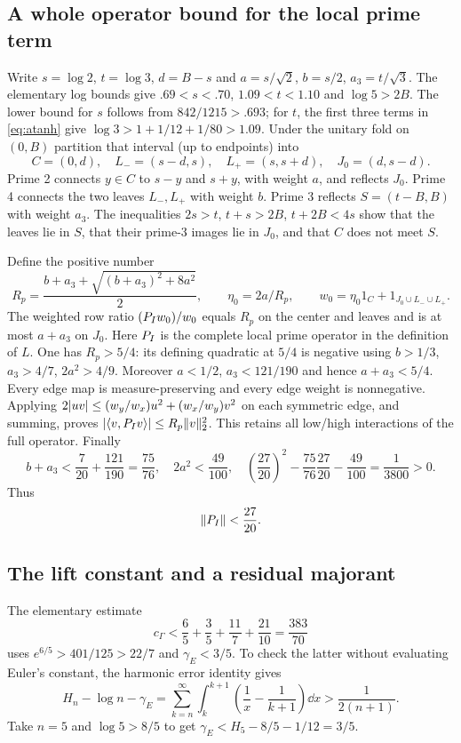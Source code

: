 \subsection{A whole operator bound for the local prime term}
Write $s=\log2$, $t=\log3$, $d=B-s$ and
$a=s/\sqrt2$, $b=s/2$, $a_3=t/\sqrt3$.
The elementary log bounds give $.69<s<.70$, $1.09<t<1.10$ and
$\log5>2B$. The lower bound for $s$ follows from $842/1215>.693$;
for $t$, the first three terms in \eqref{eq:atanh} give
$\log3>1+1/12+1/80>1.09$.
Under the unitary fold on $(0,B)$ partition that interval
(up to endpoints) into
\[
 C=(0,d),\quad L_-=(s-d,s),\quad L_+=(s,s+d),\quad
 J_0=(d,s-d).
\]
Prime 2 connects $y\in C$ to $s-y$ and $s+y$, with weight $a$,
and reflects $J_0$. Prime 4 connects the two leaves $L_-,L_+$
with weight $b$. Prime 3 reflects $S=(t-B,B)$ with weight $a_3$.
The inequalities
$2s>t$, $t+s>2B$, $t+2B<4s$ show that the leaves lie in $S$,
that their prime-3 images lie in $J_0$, and that $C$ does not meet $S$.

Define the positive number
\[
 R_p=\frac{b+a_3+\sqrt{(b+a_3)^2+8a^2}}2,
 \qquad\eta_0=2a/R_p,
 \qquad w_0=\eta_0 1_C+1_{J_0\cup L_-\cup L_+}.
\]
The weighted row ratio $(P_Iw_0)/w_0$ equals $R_p$ on the center
and leaves and is at most $a+a_3$ on $J_0$. Here
$P_I$ is the complete local prime operator in the definition of $L$.
One has $R_p>5/4$: its defining quadratic at $5/4$ is negative using
$b>1/3$, $a_3>4/7$, $2a^2>4/9$.
Moreover $a<1/2$, $a_3<121/190$ and hence $a+a_3<5/4$.
Every edge map is measure-preserving and every edge weight is
nonnegative. Applying
$2\lvert uv\rvert\le(w_y/w_x)u^2+(w_x/w_y)v^2$ on each symmetric edge,
and summing, proves
$\lvert\langle v,P_Iv\rangle\rvert\le R_p\lVert v\rVert_2^2$.
This retains all low/high interactions of the full operator.
Finally
\[
 b+a_3<\frac7{20}+\frac{121}{190}=\frac{75}{76},\quad
 2a^2<\frac{49}{100},\quad
 \left(\frac{27}{20}\right)^2-\frac{75}{76}\frac{27}{20}
 -\frac{49}{100}=\frac1{3800}>0.
\]
Thus
\begin{equation}\label{eq:primeop}
 \lVert P_I\rVert<\frac{27}{20}.
\end{equation}

\subsection{The lift constant and a residual majorant}
The elementary estimate
\begin{equation}\label{eq:cgamma}
 c_\Gamma<\frac65+\frac35+\frac{11}{7}+\frac{21}{10}
 =\frac{383}{70}
\end{equation}
uses $e^{6/5}>401/125>22/7$ and $\gamma_E<3/5$.
To check the latter without evaluating Euler's constant, the harmonic
error identity gives
\[
 H_n-\log n-\gamma_E
 =\sum_{k=n}^\infty\int_k^{k+1}
       \left(\frac1x-\frac1{k+1}\right)\dd x
 >\frac1{2(n+1)}.
\]
Take $n=5$ and $\log5>8/5$ to get
$\gamma_E<H_5-8/5-1/12=3/5$.

